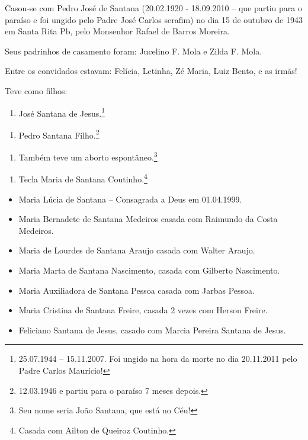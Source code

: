 \documentclass[
  brazil,
  a6paper,
  oneside,
  landscape,
  14pt]{scrbook}
\providecommand{\tightlist}{%
  \setlength{\itemsep}{0pt}\setlength{\parskip}{0pt}}
\begin{document}
Casou-se com Pedro José de Santana (20.02.1920 - 18.09.2010 -- que
partiu para o paraíso e foi ungido pelo Padre José Carlos serafim) no
dia 15 de outubro de 1943 em Santa Rita Pb, pelo Monsenhor Rafael de
Barros Moreira.

Seus padrinhos de casamento foram: Jucelino F. Mola e Zilda F. Mola.

Entre os convidados estavam: Felícia, Letinha, Zé Maria, Luiz Bento, e
as irmãs!

Teve como filhos:

\begin{enumerate}
\def\labelenumi{\arabic{enumi}.}
\tightlist
\item
  José Santana de Jesus.\footnote{25.07.1944 -- 15.11.2007. Foi ungido
    na hora da morte no dia 20.11.2011 pelo Padre Carlos Maurício!}
\end{enumerate}

\begin{enumerate}
\def\labelenumi{\arabic{enumi}.}
\setcounter{enumi}{1}
\tightlist
\item
  Pedro Santana Filho.\footnote{12.03.1946 e partiu para o paraíso 7
    meses depois.}
\end{enumerate}

\begin{enumerate}
\def\labelenumi{\arabic{enumi}.}
\setcounter{enumi}{2}
\tightlist
\item
  Também teve um aborto espontâneo.\footnote{Seu nome seria João
    Santana, que está no Céu!}
\end{enumerate}

\begin{enumerate}
\def\labelenumi{\arabic{enumi}.}
\setcounter{enumi}{3}
\tightlist
\item
  Tecla Maria de Santana Coutinho.\footnote{Casada com Ailton de Queiroz
    Coutinho.}
\end{enumerate}

\begin{itemize}
\item
  Maria Lúcia de Santana -- Consagrada a Deus em 01.04.1999.
\item
  Maria Bernadete de Santana Medeiros casada com Raimundo da Costa
  Medeiros.
\item
  Maria de Lourdes de Santana Araujo casada com Walter Araujo.
\item
  Maria Marta de Santana Nascimento, casada com Gilberto Nascimento.
\item
  Maria Auxiliadora de Santana Pessoa casada com Jarbas Pessoa.
\item
  Maria Cristina de Santana Freire, casada 2 vezes com Herson Freire.
\item
  Feliciano Santana de Jesus, casado com Marcia Pereira Santana de
  Jesus.
\end{itemize}
\end{document}

